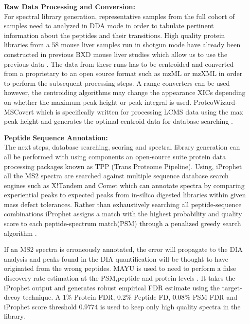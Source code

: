 \documentclass[a4paper,11pt,twoside]{book}
\begin{document}
	\textbf{Raw Data Processing and Conversion:}\\
	For spectral library generation, representative samples from the full cohort of samples need to analyzed in DDA mode in order to tabulate pertinent information about the peptides and their transitions. High quality protein libraries from a 58 mouse liver samples run in shotgun mode have already been constructed in previous BXD mouse liver studies which allow us to use the previous data \citep{Williams2016SystemsFunction}. The data from these runs has to be centroided and converted from a proprietary to an open source format such as mzML or mzXML in order to perform the subsequent processing steps. A range converters can be used however, the centroiding algorithms may change the appearance XICs depending on whether the maximum peak height or peak integral is used. ProteoWizard-MSCovert which is specifically written for processing LCMS data using the max peak height and generates the optimal centroid data for database searching \citep{Kessner2008ProteoWizard:Development}. 
	
	\textbf{Peptide Sequence Annotation:}\\
	The next steps, database searching, scoring and spectral library generation can all be performed with using components an open-source suite protein data processing packages known as TPP (Trans Proteome Pipeline). Using, iProphet \citep{Shteynberg2011IProphet:Estimates.} all the MS2 spectra are searched against multiple sequence database search engines such as X!Tandem and Comet\citep{Eng2013Comettool} which can annotate spectra by comparing experiential peaks to expected peaks from in-silico digested libraries within given mass defect tolerances. Rather than exhaustively searching all peptide-sequence combinations iProphet assigns a match with the highest probability and quality score to each peptide-spectrum match(PSM) through a penalized greedy search algorithm \citep{Shteynberg2011IProphet:Estimates.}. 
	
	If an MS2 spectra is erroneously annotated, the error will propagate to the DIA analysis and peaks found in the DIA quantification will be thought to have originated from the wrong peptides. MAYU is used to need to perform a false discovery rate estimation at the PSM,peptide and protein levels \citep{Reiter2009ProteinSpectrometry}. It takes the iProphet output and generates robust empirical FDR estimate using the target-decoy technique\citep{Elias2007Target-decoySpectrometry}. A 1\% Protein FDR, 0.2\% Peptide FD, 0.08\% PSM FDR and iProphet score threshold 0.9774 is used to keep only high quality spectra in the library. 
	
\end{document}
